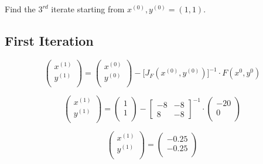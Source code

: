 \documentclass{article}
\begin{document}
\section{}
Find the $3^{rd}$ iterate starting from $x^{(0)},y^{(0)}=(1,1)$.
\vspace{10mm}
\subsection*{First Iteration}
\[
\begin{pmatrix}
  x^{(1)}  \\[1ex] 
  y^{(1)}  \\[1ex]
\end{pmatrix}
=
\begin{pmatrix}
  x^{(0)}  \\[1ex] 
  y^{(0)}  \\[1ex]
\end{pmatrix}
-
\bigg[ J_F(x^{(0)}, y^{(0)})\bigg]^{-1}\cdot F(x^{0},y^{0})
\]

\[
\begin{pmatrix}
  x^{(1)}  \\[1ex] 
  y^{(1)}  \\[1ex]
\end{pmatrix}
=
\begin{pmatrix}
  1 \\[1ex] 
  1  \\[1ex]
\end{pmatrix}
-
\begin{bmatrix}
  -8 & -8 \\[1ex] 
  8 & -8
\end{bmatrix}^{-1}
\cdot 
\begin{pmatrix}
  -20 \\[1ex] 
  0 \\[1ex] 
\end{pmatrix}
\]

\[
\begin{pmatrix}
  x^{(1)}  \\[1ex] 
  y^{(1)}  \\[1ex]
\end{pmatrix}
=
\begin{pmatrix}
  -0.25 \\[1ex] 
  -0.25 \\[1ex] 
\end{pmatrix}
\]
\end{document}
